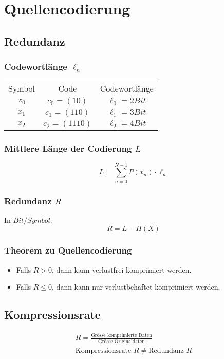 \section{Quellencodierung}
\subsection{Redundanz}
\subsubsection{Codewortlänge $\ell_n$}
\begin{center}
	\begin{tabular}{ c c c }
		Symbol & Code           & Codewortlänge    \\
		$x_0$  & $c_0 = (10)$   & $\ell_0 = 2 Bit$ \\
		$x_1$  & $c_1 = (110)$  & $\ell_1 = 3 Bit$ \\
		$x_2$  & $c_2 = (1110)$ & $\ell_2 = 4 Bit$
	\end{tabular}
\end{center}
\subsubsection{Mittlere Länge der Codierung $L$}
\begin{equation*}
	L = \sum_{n=0}^{N-1} P(x_n) \cdot \ell_n
\end{equation*}
\subsubsection{Redundanz $R$}
In $Bit/Symbol$:
\begin{equation*}
	R = L - H(X)
\end{equation*}
\subsubsection{Theorem zu Quellencodierung}
\begin{itemize}
	\item Falls $R > 0$, dann kann verlustfrei komprimiert werden.
	\item Falls $R \leq 0$, dann kann nur verlustbehaftet komprimiert werden.
\end{itemize}
\subsection{Kompressionsrate}
\begin{align*}
	R = \frac{\text{Grösse komprimierte Daten}}{\text{Grösse Originaldaten}} \\
	\text{Kompressionsrate } R \neq \text{Redundanz } R
\end{align*}
